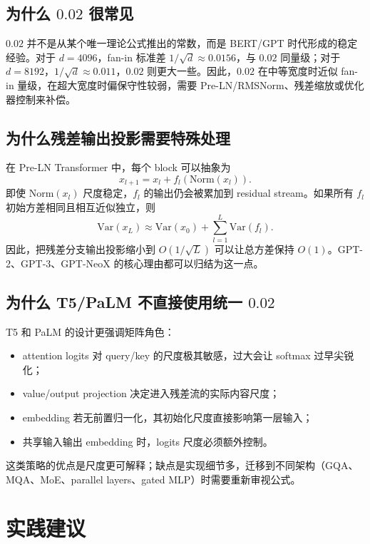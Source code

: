 \documentclass[UTF8,a4paper,11pt]{ctexart}
\begin{document}
\subsection{为什么 $0.02$ 很常见}

$0.02$ 并不是从某个唯一理论公式推出的常数，而是 BERT/GPT 时代形成的稳定经验。对于 $d=4096$，fan-in 标准差 $1/\sqrt d\approx 0.0156$，与 $0.02$ 同量级；对于 $d=8192$，$1/\sqrt d\approx 0.011$，$0.02$ 则更大一些。因此，$0.02$ 在中等宽度时近似 fan-in 量级，在超大宽度时偏保守性较弱，需要 Pre-LN/RMSNorm、残差缩放或优化器控制来补偿。

\subsection{为什么残差输出投影需要特殊处理}

在 Pre-LN Transformer 中，每个 block 可以抽象为
\[
  x_{l+1}=x_l+f_l(\mathrm{Norm}(x_l)).
\]
即使 $\mathrm{Norm}(x_l)$ 尺度稳定，$f_l$ 的输出仍会被累加到 residual stream。如果所有 $f_l$ 初始方差相同且相互近似独立，则
\[
  \mathrm{Var}(x_L)\approx \mathrm{Var}(x_0)+\sum_{l=1}^{L}\mathrm{Var}(f_l).
\]
因此，把残差分支输出投影缩小到 $O(1/\sqrt L)$ 可以让总方差保持 $O(1)$。GPT-2、GPT-3、GPT-NeoX 的核心理由都可以归结为这一点。

\subsection{为什么 T5/PaLM 不直接使用统一 $0.02$}

T5 和 PaLM 的设计更强调矩阵角色：

\begin{itemize}
  \item attention logits 对 query/key 的尺度极其敏感，过大会让 softmax 过早尖锐化；
  \item value/output projection 决定进入残差流的实际内容尺度；
  \item embedding 若无前置归一化，其初始化尺度直接影响第一层输入；
  \item 共享输入输出 embedding 时，logits 尺度必须额外控制。
\end{itemize}

这类策略的优点是尺度更可解释；缺点是实现细节多，迁移到不同架构（GQA、MQA、MoE、parallel layers、gated MLP）时需要重新审视公式。

\section{实践建议}
\end{document}
